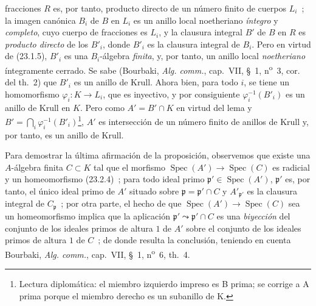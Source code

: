 fracciones $R$ es, por tanto, producto directo de un número finito de cuerpos $L_i$~;
la imagen canónica $B_i$ de $B$ en $L_i$ es un anillo local noetheriano
\emph{íntegro} y \emph{completo}, cuyo cuerpo de fracciones es $L_i$, y la
clausura integral $B'$ de $B$ en $R$ es \emph{producto directo} de los
$B'_i$, donde $B'_i$ es la clausura integral de $B_i$. Pero en virtud de
(23.1.5), $B'_i$ es una $B_i$-álgebra \emph{finita}, y, por tanto, un anillo local
\emph{noetheriano} íntegramente cerrado. Se sabe (Bourbaki,
\emph{Alg. comm.}, cap.~VII, §~1, n\textsuperscript{o}~3, cor. del th.~2) que
$B'_i$ es un anillo de Krull. Ahora bien, para todo $i$, se tiene un homomorfismo
$\varphi_i:K\to L_i$, que es inyectivo, y por consiguiente
$\varphi_i^{-1}(B'_i)$ es un anillo de Krull en $K$. Pero como
$A'=B'\cap K$ en virtud del lema y
$B'=\bigcap_i\varphi_i^{-1}(B'_i)$\footnote{Lectura diplomática: el miembro izquierdo impreso es B prima; se corrige a A prima porque el miembro derecho es un subanillo de K.}, $A'$ es intersección de un número finito
de anillos de Krull y, por tanto, es un anillo de Krull.

Para demostrar la última afirmación de la proposición, observemos que existe una
$A$-álgebra finita $C\subset K$ tal que el morfismo
$\operatorname{Spec}(A')\to\operatorname{Spec}(C)$ es radicial y un
homeomorfismo (23.2.4)~; para todo ideal primo
$\mathfrak p'\in\operatorname{Spec}(A')$, $\mathfrak p'$ es, por tanto, el único
ideal primo de $A'$ situado sobre $\mathfrak p=\mathfrak p'\cap C$ y
$A'_{\mathfrak p'}$ es la clausura integral de $C_{\mathfrak p}$~; por otra parte,
el hecho de que $\operatorname{Spec}(A')\to\operatorname{Spec}(C)$ sea un
homeomorfismo implica que la aplicación
$\mathfrak p'\leadsto\mathfrak p'\cap C$ es una \emph{biyección} del conjunto de los
ideales primos de altura $1$ de $A'$ sobre el conjunto de los ideales primos de
altura $1$ de $C$~; de donde resulta la conclusión, teniendo en cuenta Bourbaki,
\emph{Alg. comm.}, cap.~VII, §~1, n\textsuperscript{o}~6, th.~4.

